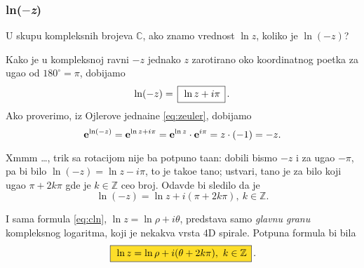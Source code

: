 \subsubsection{ln($-$\textit{z})}

\zadatak U skupu kompleksnih brojeva $\mathbb C$, ako znamo vrednost $\ln z$,
koliko je $\ln(-z)$?

\resenje Kako je u kompleksnoj ravni $-z$ jednako $z$ zarotirano 
oko koordi\-natnog po{\cv}etka
za ugao od $180^\circ=\pi$, dobijamo
$$
\ln (-z) = \ram{\ln z +i\pi}.
$$ 
Ako proverimo, iz Ojlerove jedna{\cv}ine \eqref{eq:zeuler}, dobijamo
$$
{\bf e}^{\ln(-z)} = {\bf e}^{\ln z+i\pi} = {\bf e}^{\ln z}\cdot {\bf e}^{i\pi}=z \cdot (-1)=-z.
$$

\dodatak Xmmm \dots, trik sa rotacijom nije ba{\sv} potpuno ta{\cv}an: dobili bismo $-z$ i za ugao $-\pi$,
pa bi bilo $\ln(-z)=\ln z-i\pi$, {\sv}to je tako{\dj}e ta{\cv}no;
ustvari, ta{\cv}no je za bilo koji ugao $\pi+2k\pi$ gde je $k\in{\mathbb Z}$ ceo broj. Odavde bi sledilo da je
$$
\ln(-z) = \ln z + i(\pi+2k\pi),\ k\in{\mathbb Z}.
$$

I sama formula \eqref{eq:cln}, $\ln z=\ln\rho + i\theta$, predstav{\lj}a samo {\sl glavnu granu\/}
kompleksnog logaritma, koji je nekakva vrsta 4D spirale. Potpuna formula bi bila
\begin{equation}
    \okvir{\ln z=\ln\rho + i(\theta + 2k\pi),\ k\in{\mathbb Z}} .
\end{equation}